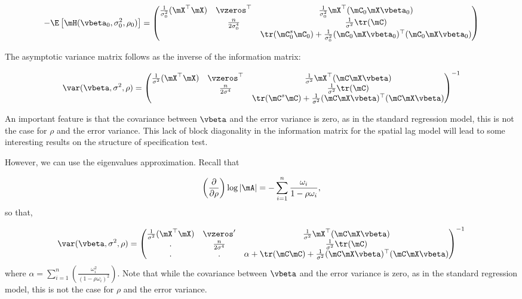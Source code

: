 \begin{subappendices}
\begin{equation}\label{eq:expected-hessian-slm}
	- \E\left[\mH(\vbeta_0, \sigma^2_0, \rho_0) \right]= 
	\begin{pmatrix}
	\frac{1}{\sigma^2_0}(\mX^\top \mX) & \vzeros^\top & \frac{1}{\sigma^2_0} \mX^\top (\mC_0\mX\vbeta_0) \\
		 &  \frac{n}{2\sigma^4_0} & \frac{1}{\sigma^2} \tr(\mC)\\
		 &  & \tr(\mC_0^s\mC_0) + \frac{1}{\sigma^2_0}(\mC_0\mX\vbeta_0)^\top(\mC_0\mX\vbeta_0)
	\end{pmatrix} 
\end{equation}

The asymptotic variance matrix follows as the inverse of the information matrix:

\begin{equation}\label{eq:asyvar_slm}
	\var(\vbeta, \sigma^2, \rho)= 
	\begin{pmatrix}
	\frac{1}{\sigma^2}(\mX^\top \mX) & \vzeros^\top & \frac{1}{\sigma^2} \mX^\top (\mC\mX\vbeta) \\
		 &  \frac{n}{2\sigma^4} & \frac{1}{\sigma^2} \tr(\mC)\\
		 &  & \tr(\mC^s\mC) + \frac{1}{\sigma^2}(\mC\mX\vbeta)^\top(\mC\mX\vbeta)
	\end{pmatrix} ^{-1}
\end{equation}

An important feature is that the covariance between $\vbeta$ and the error variance is zero, as in the standard regression model, this is not the case for $\rho$ and the error variance. This lack of block diagonality in the information matrix for the spatial lag model will lead to some interesting results on the structure of specification test.

However, we can use the eigenvalues approximation. Recall that 

\begin{equation}
\left(\frac{\partial }{\partial \rho}\right)\log \left|\mA \right| = -\sum_{i=1}^n\frac{\omega_i}{1-\rho\omega_i}, 
\end{equation}
%
so that, 

\begin{equation*}
	\var(\vbeta, \sigma^2, \rho)= 
	\begin{pmatrix}
	\frac{1}{\sigma^2}(\mX^\top \mX) & \vzeros' & \frac{1}{\sigma^2} \mX^\top (\mC\mX\vbeta) \\
		. &  \frac{n}{2\sigma^4} & \frac{1}{\sigma^2} \tr(\mC)\\
		. &  .& \alpha + \tr(\mC\mC) + \frac{1}{\sigma^2}(\mC\mX\vbeta)^\top(\mC\mX\vbeta)
	\end{pmatrix} ^{-1}
\end{equation*}
%
where $\alpha = \sum_{i=1}^n\left(\frac{\omega_i^2}{(1-\rho\omega_i)^2}\right)$. Note that while the covariance between $\vbeta$ and the error variance is zero, as in the standard regression model, this is not the case for $\rho$ and the error variance. 


\end{subappendices}

